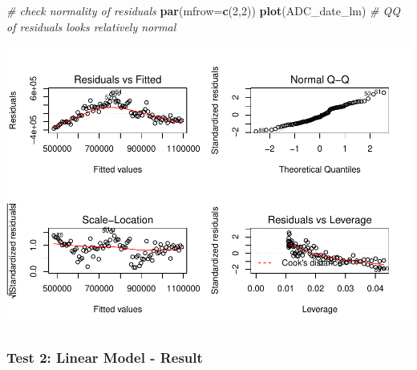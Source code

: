\documentclass[12pt,]{article}
\newenvironment{Shaded}{\begin{snugshade}}{\end{snugshade}}
\newcommand{\KeywordTok}[1]{\textcolor[rgb]{0.13,0.29,0.53}{\textbf{#1}}}
\newcommand{\DataTypeTok}[1]{\textcolor[rgb]{0.13,0.29,0.53}{#1}}
\newcommand{\DecValTok}[1]{\textcolor[rgb]{0.00,0.00,0.81}{#1}}
\newcommand{\CommentTok}[1]{\textcolor[rgb]{0.56,0.35,0.01}{\textit{#1}}}
\newcommand{\NormalTok}[1]{#1}
\begin{document}
\begin{Shaded}
\begin{Highlighting}[]
\CommentTok{# check normality of residuals}
\KeywordTok{par}\NormalTok{(}\DataTypeTok{mfrow=}\KeywordTok{c}\NormalTok{(}\DecValTok{2}\NormalTok{,}\DecValTok{2}\NormalTok{))}
\KeywordTok{plot}\NormalTok{(ADC_date_lm) }\CommentTok{# QQ of residuals looks relatively normal}
\end{Highlighting}
\end{Shaded}

\includegraphics{SKo_Project_Template_files/figure-latex/Test2_1-2.pdf}

\subsubsection{Test 2: Linear Model -
Result}\label{test-2-linear-model---result}
\end{document}
